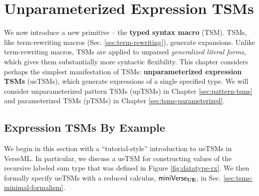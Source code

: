 \chapter{Unparameterized Expression TSMs}\label{chap:tsms}
We now introduce a new primitive -- the \textbf{typed syntax macro} (TSM). TSMs, like term-rewriting macros (Sec. \ref{sec:term-rewriting}), generate expansions. Unlike term-rewriting macros, TSMs are applied to unparsed \emph{generalized literal forms}, which gives them substantially more syntactic flexibility. This chapter considers perhaps the simplest manifestation of TSMs: \textbf{unparameterized expression TSMs} (ueTSMs), which generate expressions of a single specified type. We will consider unparameterized pattern TSMs (upTSMs) in Chapter \ref{sec:pattern-tsms} and parameterized TSMs (pTSMs) in Chapter \ref{sec:tsms-parameterized}.


\section{Expression TSMs By Example}\label{sec:tsms-by-example}
We begin in this section with a ``tutorial-style'' introduction to ueTSMs in VerseML. In particular, we discuss a ueTSM for constructing values of the recursive labeled sum type  that was defined in Figure \ref{fig:datatype-rx}. We then formally specify ueTSMs with a reduced calculus, $\mathsf{miniVerse}_\textbf{UE}$, in Sec. \ref{sec:tsms-minimal-formalism}. %

